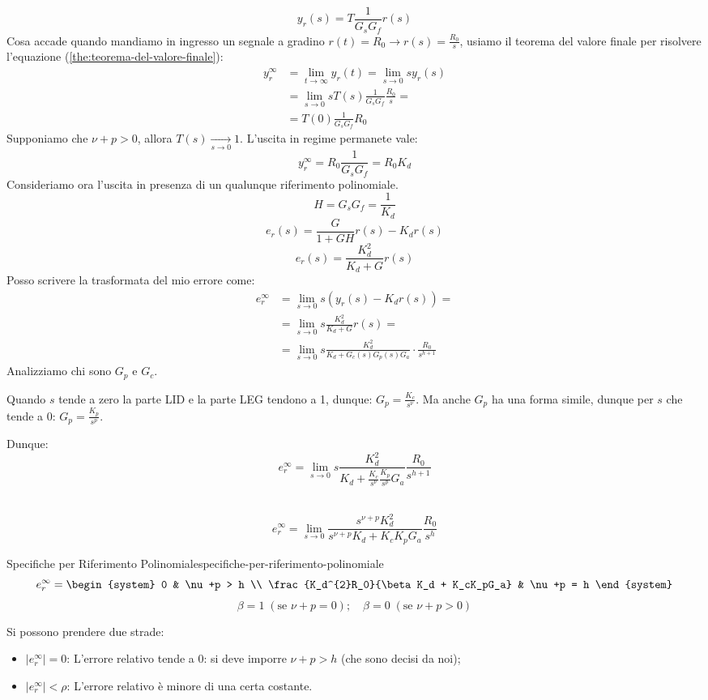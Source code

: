 \documentclass[12pt]{article}
\begin{document}
\[ y_r(s) = T \frac{1}{G_sG_f} r(s) \]
Cosa accade quando mandiamo in ingresso un segnale a gradino $r(t) = R_0 \to r(s) = \frac{R_0}{s}$, usiamo il teorema del valore finale per risolvere l'equazione (\ref{the:teorema-del-valore-finale}):
\begin{align*}
y_r^{\infty} & = \lim_{t \to \infty} y_r(t) = \lim_{s \to 0} sy_r(s) \\
& = \lim_{s \to 0} s T(s) \frac{1}{G_sG_f} \frac{R_0}{s} = \\
& = T(0) \frac{1}{G_sG_f} R_0 
\end{align*}
Supponiamo che $\nu + p > 0$, allora $T(s) \underset{s \to 0}{\longrightarrow} 1$. L'uscita in regime permanete vale:
\[ \boxed{y_r^{\infty} = R_0 \frac{1}{G_sG_f} = R_0 K_d} \]
Consideriamo ora l'uscita in presenza di un qualunque riferimento polinomiale.
\[ H = G_sG_f = \frac{1}{K_d} \]
\[ e_r(s) = \frac{G}{1 + GH}  r(s) - K_dr(s) \]
\[ \boxed{ e_r(s) = \frac{K_d^{2}}{K_d + G} r(s) } \]
Posso scrivere la trasformata del mio errore come:
\begin{align*}
e_r^{\infty} & = \lim_{s \to 0} s (y_r(s) - K_dr(s)) = \\
     & = \lim_{s \to 0} s \frac{K_d^{2}}{K_d + G} r(s) = \\
     & = \boxed{\lim_{s \to 0} s\frac{K_d^{2}}{K_d + G_c(s)G_p(s)G_a} \cdot \frac{R_0}{s^{h+1}} }
\end{align*}
Analizziamo chi sono $G_p$ e $G_c$.

Quando $s$ tende a zero la parte LID e la parte LEG tendono a 1, dunque:
$G_p = \frac{K_c}{s^{\nu}} $.
Ma anche $G_p$ ha una forma simile, dunque per $s$ che tende a 0: $G_p = \frac{K_p}{s^{p}} $.

Dunque:
\[ e_r^{\infty} = \lim_{s \to 0} s \frac{K_d^{2}}{K_d + \frac{K_c}{s^{\nu}} \frac{K_p}{s^{p}} G_a } \frac{R_0}{s^{h+1}}   \]\

\[ e_r^{\infty} = \lim_{s \to 0}  \frac{s^{\nu+p}K_d^{2}}{s^{\nu+p}K_d + K_cK_pG_a} \frac{R_0}{s^{h}} \]
\begin{theorem}{Specifiche per Riferimento Polinomiale}{specifiche-per-riferimento-polinomiale}
    \[ e_r^{\infty} = \begin{system} 
    0 & \nu+p > h \\
    \frac{K_d^{2}R_0}{\beta K_d + K_cK_pG_a} & \nu+p = h
    \end{system}  \]
    \[ \beta  = 1\;(\text{se }\nu + p = 0) ;\quad \beta = 0\; (\text{se }\nu + p > 0)  \]
    \end{theorem}
Si possono prendere due strade:
\begin{itemize}
    \item $|e_r^{\infty}| = 0$: L'errore relativo tende a 0: si deve imporre $\nu + p > h$ (che sono decisi da noi);
    \item $|e_r^{\infty}| < \rho$: L'errore relativo \`e minore di una certa costante.
\end{itemize}
\end{document}
